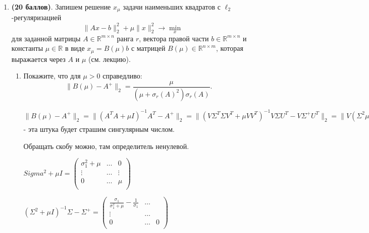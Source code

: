 \documentclass[a4paper, 11pt]{article}
\newcommand{\prob}[1]{\item \textbf{(#1 баллов)}.}
\begin{document}
\begin{enumerate}
\begin{enumerate}
		На $i$"=той итерации $H_{n - i} = \begin{pmatrix}
			I_{n - i} & 0 \\
			0 & H(V_{n - i}) \\
		\end{pmatrix}$ уйдет $4(m - n + i) \cdot i$ из тех же соображений, что и в предыдущем пункте.
	
		Итого:
		
		$\displaystyle \sum_{i = 1}^{n} 4mi - 4ni + 4i^2 = 2mn^2 - \frac{2n^3}{3} + O(mn)$
		
			
	\end{enumerate}
	
	\prob{20} Запишем решение $x_\mu$ задачи наименьших квадратов с $\ell_2$-регуляризацией
	\[
	\|Ax - b\|_2^2 + \mu \|x\|_2^2 \to \min_x
	\]
	для заданной матрицы $A\in\mathbb{R}^{m\times n}$ ранга $r$, вектора правой части $b\in\mathbb{R}^{m\times n}$ и константы $\mu\in\mathbb{R}$ в виде
	$x_\mu = B(\mu) b$
	с матрицей $B(\mu)\in \mathbb{R}^{n\times m}$, которая выражается через $A$ и $\mu$ (см. лекцию).
	\begin{enumerate}
		\item Покажите, что для $\mu>0$ справедливо:
		\[
		\|B(\mu) - A^+\|_2 = \frac{\mu}{\left(\mu + \sigma_r(A)^2\right)\sigma_r(A)}.
		\]
		
			$\|B(\mu) - A^+\|_2 = \|(A^TA + \mu I)^{-1} A^T - A^+\|_2 = \|(V \Sigma^T \Sigma V^T   +\mu V V^T )^{-1} V \Sigma U^T - V \Sigma^+ U^T \|_2 = \| V (\Sigma^2 \mu I )^{-1}  V^{-1}V \Sigma U^T - V \Sigma^+ U^T \|_2 = \|V ((\Sigma^2  + \mu I)^{-1} \Sigma U^T - \Sigma^+ U^T)\|_2 = \|(\Sigma^2 + \mu I)^{-1} \Sigma - \Sigma^+\|_2$ - эта штука будет страшим сингулярным числом. 
			
			Обращать скобу можно, там определитель ненулевой.
			
			$Sigma^2 + \mu I = \begin{pmatrix}
				\sigma_1^2  + \mu & \dots & 0 \\
				\vdots & \dots & \vdots \\
				0 & \dots & \mu \\
			\end{pmatrix}$
		
			$(\Sigma^2 + \mu I)^{-1} \Sigma - \Sigma^+ = \begin{pmatrix}
				\frac{\sigma_1}{\sigma_1^2 + \mu} - \frac{1}{\sigma_1} & \dots \\
				\vdots & \dots \\
				0 & \dots & 0 \\
			\end{pmatrix}$
		

\end{enumerate}
\end{enumerate}
\end{document}
